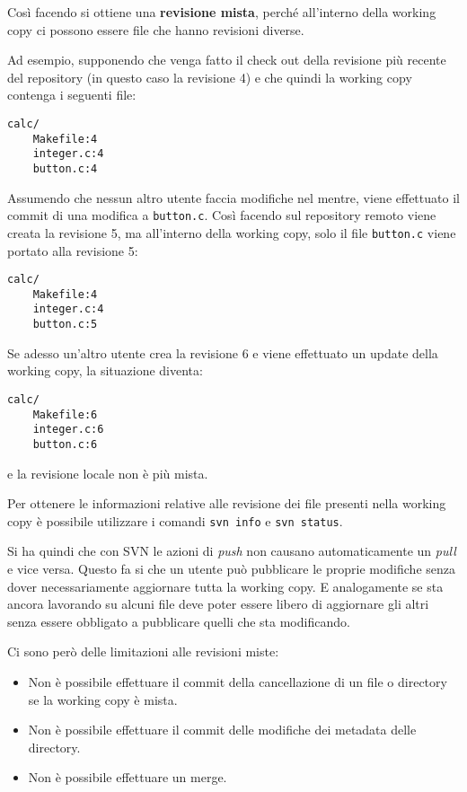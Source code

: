 Così facendo si ottiene una \textbf{revisione mista}, perché all'interno della working copy ci possono essere file che hanno revisioni diverse.

Ad esempio, supponendo che venga fatto il check out della revisione più recente del repository (in questo caso la revisione 4) e che quindi la working copy contenga i seguenti file:

\begin{verbatim}
calc/
	Makefile:4
	integer.c:4
	button.c:4
\end{verbatim}

Assumendo che nessun altro utente faccia modifiche nel mentre, viene effettuato il commit di una modifica a \texttt{button.c}. Così facendo sul repository remoto viene creata la revisione 5, ma all'interno della working copy, solo il file \texttt{button.c} viene portato alla revisione 5:

\begin{verbatim}
calc/
	Makefile:4
	integer.c:4
	button.c:5
\end{verbatim}

Se adesso un'altro utente crea la revisione 6 e viene effettuato un update della working copy, la situazione diventa:

\begin{verbatim}
calc/
	Makefile:6
	integer.c:6
	button.c:6
\end{verbatim}

e la revisione locale non è più mista.

Per ottenere le informazioni relative alle revisione dei file presenti nella working copy è possibile utilizzare i comandi \texttt{svn info} e \texttt{svn status}.

Si ha quindi che con SVN le azioni di \textit{push} non causano automaticamente un \textit{pull} e vice versa. Questo fa si che un utente può pubblicare le proprie modifiche senza dover necessariamente aggiornare tutta la working copy. E analogamente se sta ancora lavorando su alcuni file deve poter essere libero di aggiornare gli altri senza essere obbligato a pubblicare quelli che sta modificando.

Ci sono però delle limitazioni alle revisioni miste:
\begin{itemize}
	\item Non è possibile effettuare il commit della cancellazione di un file o directory se la working copy è mista.
	\item Non è possibile effettuare il commit delle modifiche dei metadata delle directory.
	\item Non è possibile effettuare un merge.
\end{itemize}


